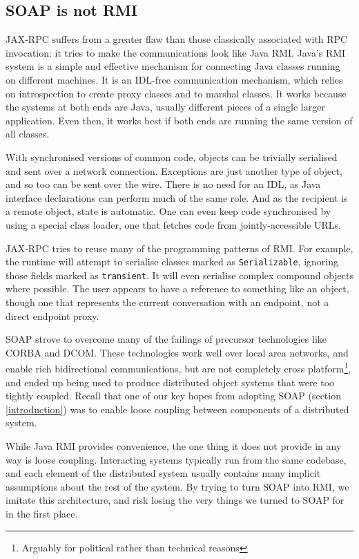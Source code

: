 \subsection{SOAP is not RMI}
\label{objections:soap-not-rmi}

JAX-RPC suffers from a greater flaw than those classically associated
with RPC invocation: it tries to make the communications look like
Java RMI. Java's RMI system is a simple and effective mechanism for
connecting Java classes running on different machines. It is an
IDL-free communication mechanism, which relies on introspection to
create proxy classes and to marshal classes. It works because the
systems at both ends are Java, usually different pieces of a single
larger application. Even then, it works best if both ends are running
the same version of all classes.

With synchronised versions of common code, objects can be trivially
serialised and sent over a network connection. Exceptions are just
another type of object, and so too can be sent over the wire. There is
no need for an IDL, as Java interface declarations can perform much of
the same role. And as the recipient is a remote object, state is
automatic.  One can even keep code synchronised by using a special
class loader, one that fetches code from jointly-accessible URLs.

JAX-RPC tries to reuse many of the programming patterns of RMI. For
example, the runtime will attempt to serialise classes marked as
{\tt Serializable}, ignoring those fields marked as
{\tt transient}. It will even serialise complex compound objects where
possible. The user appears to have a reference to something like an
object, though one that represents the current conversation with an
endpoint, not a direct endpoint proxy.

SOAP strove to overcome many of the failings of precursor technologies
like CORBA and DCOM. These technologies work well over local area
networks, and enable rich bidirectional communications, but are not
completely cross platform\footnote{Arguably for political rather than
technical reasons}, and ended up being used to produce distributed
object systems that were too tightly coupled. Recall that one of our
key hopes from adopting SOAP (section \ref{introduction}) was to
enable loose coupling between components of a distributed system.

While Java RMI provides convenience, the one thing it does not provide in any way
is loose coupling. Interacting systems typically run from the same
codebase, and each element of the distributed system usually contains many 
implicit assumptions about the rest of the system. By trying to turn SOAP into RMI,
we imitate this architecture, and risk losing
the very things we turned to SOAP for in the first place.

